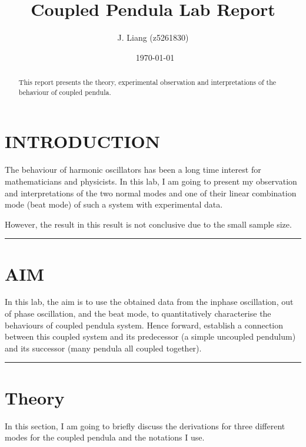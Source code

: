 \documentclass[aps,prl,reprint,10pt,amsmath,amssymb,superscriptaddress,a4paper]{revtex4-2}
\begin{document}
\title{Coupled Pendula Lab Report}
\author{J. Liang (z5261830)}
\date{\currenttime~\today}
\begin{abstract}
    This report presents the theory, experimental observation and interpretations of the behaviour of coupled pendula.
\end{abstract}

\maketitle
\section{INTRODUCTION}
The behaviour of harmonic oscillators has been a long time interest for mathematicians and physicists. In this lab, I am going to present my observation and interpretations of the two normal modes and one of their linear combination mode (beat mode) of such a system with experimental data.

However, the result in this result is not conclusive due to the small sample size. 
\par\noindent\rule{\linewidth}{0.4pt}

\section{AIM}
In this lab, the aim is to use the obtained data from the inphase oscillation, out of phase oscillation, and the beat mode, to quantitatively characterise the behaviours of coupled pendula system. Hence forward, establish a connection between this coupled system and its predecessor (a simple uncoupled pendulum) and its successor (many pendula all coupled together).
\par\noindent\rule{\linewidth}{0.4pt}

\section{Theory}
In this section, I am going to briefly discuss the derivations for three different modes for the coupled pendula and the notations I use.
\end{document}

